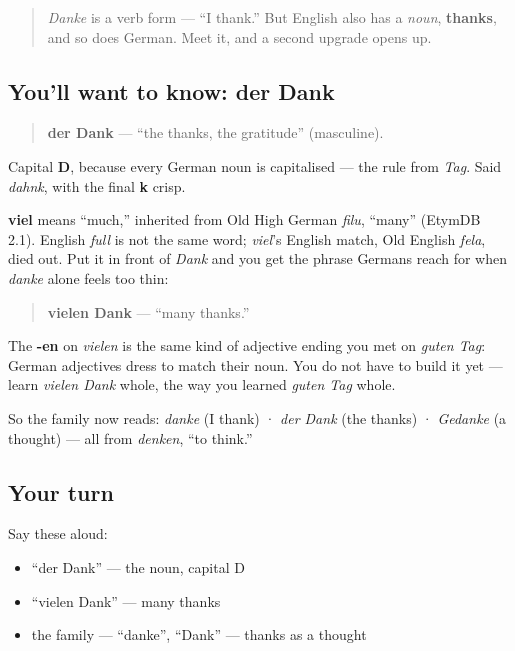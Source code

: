 \begin{quote}
\emph{Danke} is a verb form — \textquotedblleft{}I thank.\textquotedblright{} But English also has a \emph{noun}, \textbf{thanks}, and so does German. Meet it, and a second upgrade opens up.
\end{quote}

\subsection*{You'll want to know: der Dank}
\begin{quote}
\textbf{der Dank} — \textquotedblleft{}the thanks, the gratitude\textquotedblright{} (masculine).
\end{quote}

Capital \textbf{D}, because every German noun is capitalised — the rule from \emph{Tag}. Said \emph{dahnk}, with the final \textbf{k} crisp.

\begin{cousinweb}
\textbf{viel} means \textquotedblleft{}much,\textquotedblright{} inherited from Old High German \emph{filu}, \textquotedblleft{}many\textquotedblright{} (EtymDB 2.1). English \emph{full} is not the same word; \emph{viel}'s English match, Old English \emph{fela}, died out. Put it in front of \emph{Dank} and you get the phrase Germans reach for when \emph{danke} alone feels too thin:

\begin{quote}
\textbf{vielen Dank} — \textquotedblleft{}many thanks.\textquotedblright{}
\end{quote}

The \textbf{-en} on \emph{vielen} is the same kind of adjective ending you met on \emph{guten Tag}: German adjectives dress to match their noun. You do not have to build it yet — learn \emph{vielen Dank} whole, the way you learned \emph{guten Tag} whole.

So the family now reads: \emph{danke} (I thank) · \emph{der Dank} (the thanks) · \emph{Gedanke} (a thought) — all from \emph{denken}, \textquotedblleft{}to think.\textquotedblright{}
\end{cousinweb}

\subsection*{Your turn}
Say these aloud:

\begin{itemize}
\raggedright
  \item \textquotedblleft{}der Dank\textquotedblright{} — the noun, capital D
  \item \textquotedblleft{}vielen Dank\textquotedblright{} — many thanks
  \item the family — \textquotedblleft{}danke\textquotedblright{}, \textquotedblleft{}Dank\textquotedblright{} — thanks as a thought
\end{itemize}

